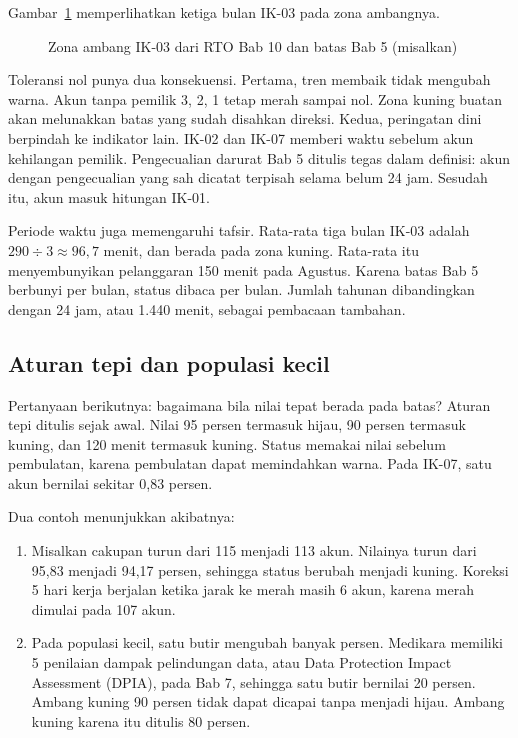 Gambar~\ref{fig:ch13-ambang-gambar} memperlihatkan ketiga bulan IK-03 pada zona ambangnya.

\begin{figure}[!htb]
  \centering
  
  \caption{Zona ambang IK-03 dari RTO Bab 10 dan batas Bab 5 (misalkan)}
  \label{fig:ch13-ambang-gambar}
\end{figure}

Toleransi nol punya dua konsekuensi. Pertama, tren membaik tidak mengubah warna. Akun tanpa pemilik
3, 2, 1 tetap merah sampai nol. Zona kuning buatan akan melunakkan batas yang sudah disahkan
direksi. Kedua, peringatan dini berpindah ke indikator lain. IK-02 dan IK-07 memberi waktu sebelum
akun kehilangan pemilik. Pengecualian darurat Bab 5 ditulis tegas dalam definisi: akun dengan
pengecualian yang sah dicatat terpisah selama belum 24 jam. Sesudah itu, akun masuk hitungan IK-01.

Periode waktu juga memengaruhi tafsir. Rata-rata tiga bulan IK-03 adalah $290 \div 3 \approx 96{,}7$
menit, dan berada pada zona kuning. Rata-rata itu menyembunyikan pelanggaran 150 menit pada Agustus.
Karena batas Bab 5 berbunyi per bulan, status dibaca per bulan. Jumlah tahunan dibandingkan dengan
24 jam, atau 1.440 menit, sebagai pembacaan tambahan.

\subsection*{Aturan tepi dan populasi kecil}

Pertanyaan berikutnya: bagaimana bila nilai tepat berada pada batas? Aturan tepi ditulis sejak awal.
Nilai 95 persen termasuk hijau, 90 persen termasuk kuning, dan 120 menit termasuk kuning. Status
memakai nilai sebelum pembulatan, karena pembulatan dapat memindahkan warna. Pada IK-07, satu akun
bernilai sekitar 0,83 persen.

Dua contoh menunjukkan akibatnya:
\begin{enumerate}
  \item Misalkan cakupan turun dari 115 menjadi 113 akun. Nilainya turun dari 95,83 menjadi 94,17
  persen, sehingga status berubah menjadi kuning. Koreksi 5 hari kerja berjalan ketika jarak ke
  merah masih 6 akun, karena merah dimulai pada 107 akun.
  \item Pada populasi kecil, satu butir mengubah banyak persen. Medikara memiliki 5 penilaian
  dampak pelindungan data, atau Data Protection Impact Assessment (DPIA), pada Bab 7, sehingga satu
  butir bernilai 20 persen. Ambang kuning 90 persen tidak dapat dicapai tanpa menjadi hijau. Ambang
  kuning karena itu ditulis 80 persen.
\end{enumerate}

